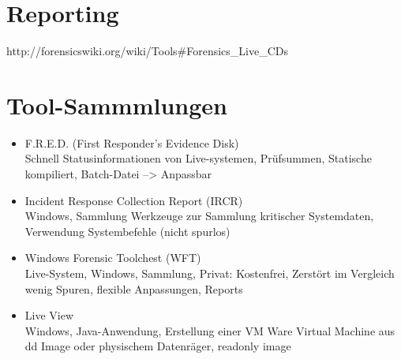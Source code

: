 \section{Reporting}




http://forensicswiki.org/wiki/Tools#Forensics_Live_CDs

\section{Tool-Sammmlungen}
\begin{itemize}
\item F.R.E.D. (First Responder's Evidence Disk)\\
Schnell Statusinformationen von Live-systemen, Prüfsummen, Statische kompiliert, Batch-Datei --> Anpassbar
\item Incident Response Collection Report (IRCR)\\
Windows, Sammlung Werkzeuge zur Sammlung kritischer Systemdaten, Verwendung Systembefehle (nicht spurlos)
\item Windows Forensic Toolchest (WFT)\\
Live-System, Windows, Sammlung, Privat: Kostenfrei, Zerstört im Vergleich wenig Spuren, flexible Anpassungen, Reports
\item Live View\\
Windows, Java-Anwendung, Erstellung einer VM Ware Virtual Machine aus dd Image oder physischem Datenräger, readonly image
\end{itemize}


